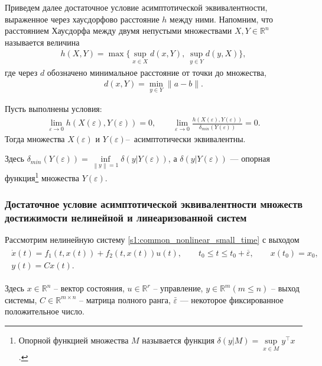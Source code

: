 \documentclass[../main.tex]{subfiles}
\begin{document}
Приведем далее достаточное условие асимптотической эквивалентности, выраженное через хаусдорфово расстояние $ h $ между ними. 
Напомним, что расстоянием Хаусдорфа между двумя непустыми множествами $X, Y \in \mathbb{R}^n$ называется величина 
\begin{gather*}
	h(X,Y) = \max\Big\{ \sup\limits_{x \in X}  d(x, Y), \ \sup\limits_{y \in Y}  d(y, X) \Big\},
\end{gather*}
где через $d$ обозначено минимальное расстояние от точки до множества, 
\begin{gather*}
	d(x, Y) = \min\limits_{y \in Y} \| a - b\|.
\end{gather*} 
\begin{theorem}\label{suff}\cite{GusevUMJ}
     Пусть выполнены условия:
    \begin{gather*}
        \lim\limits_{\varepsilon \rightarrow 0}h(X(\varepsilon),Y(\varepsilon)) = 0, \qquad    \lim\limits_{\varepsilon \rightarrow 0}\frac{h(X(\varepsilon),Y(\varepsilon))}{\delta_{min}(Y(\varepsilon))} = 0.
    \end{gather*}
    Тогда множества $ X(\varepsilon) $ и $ Y(\varepsilon) $\---~асимптотически эквивалентны. 
    
    Здесь $ \delta_{min}(Y(\varepsilon)) = \inf\limits_{\left\|y \right\| =1 } \delta(y|Y(\varepsilon))$, а $ \delta(y|Y(\varepsilon)) $ --- опорная функция\footnote{
    Опорной функцией множества $M$ называется функция $\delta(y|M) = \sup\limits_{x \in M} y^{\top} x$. 
    } множества $ Y(\varepsilon) $.
\end{theorem}
\subsubsection{Достаточное условие асимптотической эквивалентности множеств достижимости нелинейной и линеаризованной систем}
    Рассмотрим нелинейную систему \eqref{s1:common_nonlinear_small_time} с выходом
\begin{gather}\label{s2:nonlinear_with_output}
    \begin{gathered}
        \dot{x}(t)=f_1(t,x(t))+f_2(t,x(t))u(t), \qquad t_0 \leqslant t \leqslant t_0 + \overline{\varepsilon}, \qquad x(t_0) = x_0, \\
        y(t) = C x(t).
    \end{gathered}
\end{gather}

Здесь $ x \in \mathbb{R}^n $ -- вектор состояния, $ u \in \mathbb{R}^r $ -- управление,  $ y\in\mathbb{R}^m (m \leqslant n) $ -- выход системы,
$ C\in \mathbb{R}^{m \times n} $  -- матрица полного ранга,  $ \bar{\varepsilon} $ --- некоторое фиксированное положительное число.
\end{document}
